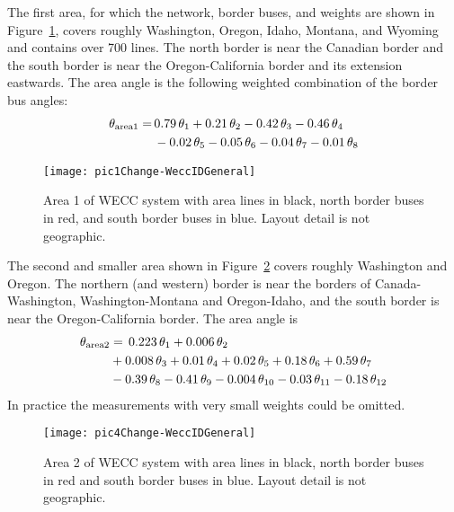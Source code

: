 \documentclass[conference]{IEEEtran}
\begin{document}
The first area, for which the network, border buses, and weights are shown in Figure~\ref{pic1Change-WeccIDGeneral}, covers roughly Washington, Oregon, Idaho, Montana, and Wyoming and contains over 700 lines. The north border is near the Canadian border and the 
south border is near the Oregon-California border and its extension eastwards.
The  area angle is the following weighted combination of the border bus angles:
    \begin{align}
\theta_{\rm area1} =\, & 0.79\,  \theta_1 + 0.21\,  \theta_2 - 0.42 \,\theta_3 - 0.46 \,\theta_4\notag\\&
   - 0.02 \,\theta_5 - 0.05 \,\theta_6- 0.04 \,\theta_7 - 0.01 \,\theta_8 \notag
  \end{align}
\begin{figure}[]
   \begin{center}
   \texttt{[image: pic1Change-WeccIDGeneral]}
   \caption{Area 1 of WECC system with area lines in black, north border buses in red, and south border buses in blue. Layout detail is not  geographic.}   \label{pic1Change-WeccIDGeneral}
   \end{center}
   \end{figure} 


The second and smaller area shown in  Figure~\ref{pic4Change-WeccIDGeneral} covers roughly Washington and Oregon. The northern (and western) border is near the borders of Canada-Washington,  Washington-Montana and Oregon-Idaho, and the south border is near the Oregon-California border.
       The  area angle is 
    \begin{align}
\theta_{\rm area2} &=\,  0.223\,  \theta_1 + 0.006\,  \theta_2\notag\\& + 0.008 \,\theta_3 + 0.01 \,\theta_4
   + 0.02 \,\theta_5 + 0.18 \,\theta_6+ 0.59 \,\theta_7\notag\\& - 0.39 \,\theta_8 
      - 0.41 \,\theta_9 - 0.004 \,\theta_{10}- 0.03 \,\theta_{11} - 0.18 \,\theta_{12}\notag
  \end{align}
In practice the measurements with very small weights could be omitted.

  \begin{figure}[h]
  \begin{center}
  \texttt{[image: pic4Change-WeccIDGeneral]}
  \caption{Area 2 of WECC system with area lines in black, north border buses in red and south border buses in blue. Layout detail is not  geographic.}
  \label{pic4Change-WeccIDGeneral}
  \end{center}
  \end{figure} 
  
\end{document}
